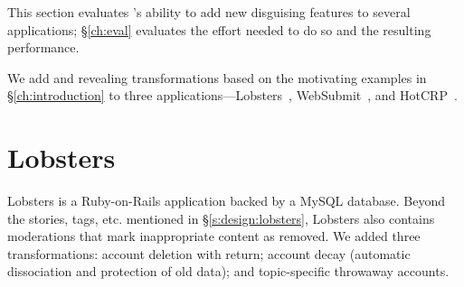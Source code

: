This section evaluates \sys's ability to add new disguising features to
several applications; \S\ref{ch:eval} evaluates the effort needed to do so and the
resulting performance.
%

%
We add \xxing and revealing transformations based on
the motivating examples in \S\ref{ch:introduction}
to three applications---Lobsters~\cite{lobsters},
WebSubmit~\cite{websubmit-rs},
and HotCRP~\cite{hotcrp}.
%
%
%


\section{Lobsters}
\label{s:cs:lobsters}

%
Lobsters is a Ruby-on-Rails application backed by a MySQL database.
%
Beyond the stories, tags, etc. mentioned in \S\ref{s:design:lobsters}, Lobsters also contains
moderations that mark inappropriate content as removed.
%
We added three \xxing transformations: account deletion with return; account
decay (\ie automatic dissociation and protection of old data); and topic-specific
throwaway accounts.
%

